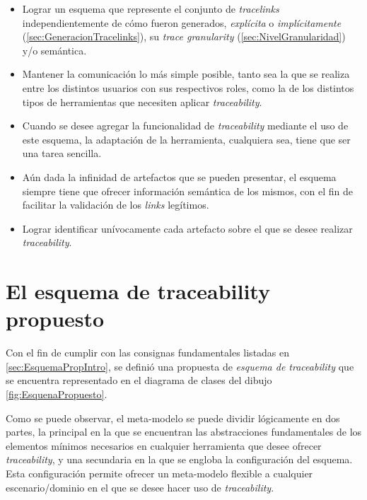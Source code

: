 \documentclass[a4paper,12pt,oneside,spanish]{book}
\begin{document}
\begin{itemize}

\item Lograr un esquema que represente el conjunto de \textit{tracelinks} independientemente de cómo fueron generados, \textit{explícita} o \textit{implícitamente} (\ref{sec:GeneracionTracelinks}), su \textit{trace granularity} (\ref{sec:NivelGranularidad}) y/o semántica.

\item Mantener la comunicación lo más simple posible, tanto sea la que se realiza entre los distintos usuarios con sus respectivos roles, como la de los distintos tipos de herramientas que necesiten aplicar \textit{traceability}.

\item Cuando se desee agregar la funcionalidad de \textit{traceability} mediante el uso de este esquema, la adaptación de la herramienta, cualquiera sea, tiene que ser una tarea sencilla.

\item Aún dada la infinidad de artefactos que se pueden presentar, el esquema siempre tiene que ofrecer información semántica de los mismos, con el fin de facilitar la validación de los \textit{links} legítimos.

\item Lograr identificar unívocamente cada artefacto sobre el que se desee realizar \textit{traceability}.

\end{itemize}

\section{El esquema de traceability propuesto}
\label{sec:EsquemaTraceability}

Con el fin de cumplir con las consignas fundamentales listadas en \ref{sec:EsquemaPropIntro}, se definió una propuesta de \textit{esquema de traceability} que se encuentra representado en el diagrama de clases del dibujo \ref{fig:EsquenaPropuesto}.

Como se puede observar, el meta-modelo se puede dividir lógicamente en dos partes, la principal en la que se encuentran las abstracciones fundamentales de los elementos mínimos necesarios en cualquier herramienta que desee ofrecer \textit{traceability}, y una secundaria en la que se engloba la configuración del esquema. Esta configuración permite ofrecer un meta-modelo flexible a cualquier escenario/dominio en el que se desee hacer uso de \textit{traceability}.
\end{document}
